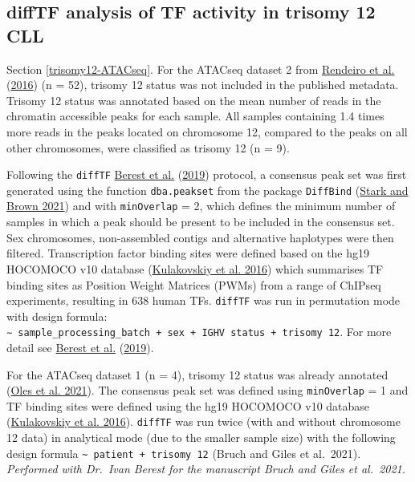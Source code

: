 \documentclass[11pt, a4paper, twosided]{book}
\begin{document}
\hypertarget{trisomy12-ATACseq-method}{%
\subsection{diffTF analysis of TF activity in trisomy 12 CLL}\label{trisomy12-ATACseq-method}}

Section \ref{trisomy12-ATACseq}. For the ATACseq dataset 2 from \protect\hyperlink{ref-Rendeiro2016}{Rendeiro et al.} (\protect\hyperlink{ref-Rendeiro2016}{2016}) (n = 52), trisomy 12 status was not included in the published metadata. Trisomy 12 status was annotated based on the mean number of reads in the chromatin accessible peaks for each sample. All samples containing 1.4 times more reads in the peaks located on chromosome 12, compared to the peaks on all other chromosomes, were classified as trisomy 12 (n = 9).

Following the \texttt{diffTF} \protect\hyperlink{ref-Berest2019}{Berest et al.} (\protect\hyperlink{ref-Berest2019}{2019}) protocol, a consensus peak set was first generated using the function \texttt{dba.peakset} from the package \texttt{DiffBind} (\protect\hyperlink{ref-R-DiffBind}{Stark and Brown 2021}) and with \texttt{minOverlap} = 2, which defines the minimum number of samples in which a peak should be present to be included in the consensus set. Sex chromosomes, non-assembled contigs and alternative haplotypes were then filtered. Transcription factor binding sites were defined based on the hg19 HOCOMOCO v10 database (\protect\hyperlink{ref-HOCOMOCO}{Kulakovskiy et al. 2016}) which summarises TF binding sites as Position Weight Matrices (PWMs) from a range of ChIPseq experiments, resulting in 638 human TFs. \texttt{diffTF} was run in permutation mode with design formula: \texttt{∼\ sample\_processing\_batch\ +\ sex\ +\ IGHV\ status\ +\ trisomy\ 12}. For more detail see \protect\hyperlink{ref-Berest2019}{Berest et al.} (\protect\hyperlink{ref-Berest2019}{2019}).

For the ATACseq dataset 1 (n = 4), trisomy 12 status was already annotated (\protect\hyperlink{ref-R-BloodCancerMultiOmics2017}{Oles et al. 2021}). The consensus peak set was defined using \texttt{minOverlap} = 1 and TF binding sites were defined using the hg19 HOCOMOCO v10 database (\protect\hyperlink{ref-HOCOMOCO}{Kulakovskiy et al. 2016}). \texttt{diffTF} was run twice (with and without chromosome 12 data) in analytical mode (due to the smaller sample size) with the following design formula \texttt{\textasciitilde{}\ patient\ +\ trisomy\ 12} (Bruch and Giles et al.~2021). \emph{Performed with Dr.~Ivan Berest for the manuscript Bruch and Giles et al.~2021.}
\end{document}
